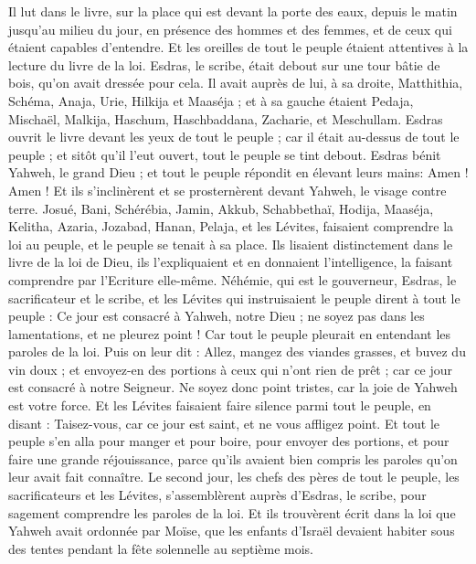 \begin{multicols}{2}
Il lut dans le livre, sur la place qui est devant la porte des eaux, depuis le matin jusqu'au milieu du jour, en présence des hommes et des femmes, et de ceux qui étaient capables d'entendre. Et les oreilles de tout le peuple étaient attentives à la lecture du livre de la loi.
Esdras, le scribe, était debout sur une tour bâtie de bois, qu'on avait dressée pour cela. Il avait auprès de lui, à sa droite, Matthithia, Schéma, Anaja, Urie, Hilkija et Maaséja ; et à sa gauche étaient Pedaja, Mischaël, Malkija, Haschum, Haschbaddana, Zacharie, et Meschullam.
Esdras ouvrit le livre devant les yeux de tout le peuple ; car il était au-dessus de tout le peuple ; et sitôt qu'il l'eut ouvert, tout le peuple se tint debout.
Esdras bénit Yahweh, le grand Dieu ; et tout le peuple répondit en élevant leurs mains: Amen ! Amen ! Et ils s'inclinèrent et se prosternèrent devant Yahweh, le visage contre terre.
Josué, Bani, Schérébia, Jamin, Akkub, Schabbethaï, Hodija, Maaséja, Kelitha, Azaria, Jozabad, Hanan, Pelaja, et les Lévites, faisaient comprendre la loi au peuple, et le peuple se tenait à sa place.
Ils lisaient distinctement dans le livre de la loi de Dieu, ils l'expliquaient et en donnaient l'intelligence, la faisant comprendre par l'Ecriture elle-même.
Néhémie, qui est le gouverneur, Esdras, le sacrificateur et le scribe, et les Lévites qui instruisaient le peuple dirent à tout le peuple : Ce jour est consacré à Yahweh, notre Dieu ; ne soyez pas dans les lamentations, et ne pleurez point ! Car tout le peuple pleurait en entendant les paroles de la loi.
Puis on leur dit : Allez, mangez des viandes grasses, et buvez du vin doux ; et envoyez-en des portions à ceux qui n'ont rien de prêt ; car ce jour est consacré à notre Seigneur. Ne soyez donc point tristes, car la joie de Yahweh est votre force.
Et les Lévites faisaient faire silence parmi tout le peuple, en disant : Taisez-vous, car ce jour est saint, et ne vous affligez point.
Et tout le peuple s'en alla pour manger et pour boire, pour envoyer des portions, et pour faire une grande réjouissance, parce qu'ils avaient bien compris les paroles qu'on leur avait fait connaître.
Le second jour, les chefs des pères de tout le peuple, les sacrificateurs et les Lévites, s'assemblèrent auprès d’Esdras, le scribe, pour sagement comprendre les paroles de la loi.
Et ils trouvèrent écrit dans la loi que Yahweh avait ordonnée par Moïse, que les enfants d'Israël devaient habiter sous des tentes pendant la fête solennelle au septième mois.

\end{multicols}
